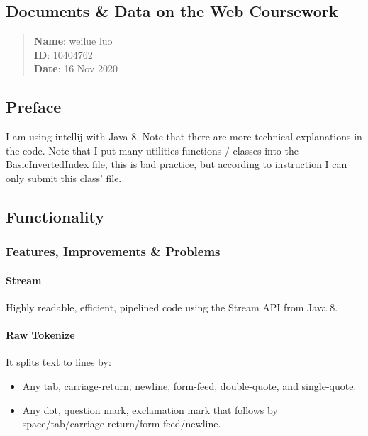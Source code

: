 \documentclass[
]{article}
\author{}
\date{}
\begin{document}
\hypertarget{header-n0}{%
\subsection{Documents \& Data on the Web Coursework}\label{header-n0}}

\begin{quote}
\textbf{Name}: weilue luo\\
\textbf{ID}: 10404762\\
\textbf{Date}: 16 Nov 2020
\end{quote}

\tableofcontents

\hypertarget{header-n7}{%
\subsection{Preface}\label{header-n7}}

I am using intellij with Java 8. Note that there are more technical
explanations in the code. Note that I put many utilities functions /
classes into the BasicInvertedIndex file, this is bad practice, but
according to instruction I can only submit this class' file.

\hypertarget{header-n9}{%
\subsection{Functionality}\label{header-n9}}

\hypertarget{header-n10}{%
\subsubsection{Features, Improvements \& Problems}\label{header-n10}}

\hypertarget{header-n426}{%
\paragraph{Stream}\label{header-n426}}

Highly readable, efficient, pipelined code using the Stream API from
Java 8.

\hypertarget{header-n15}{%
\paragraph{Raw Tokenize}\label{header-n15}}

It splits text to lines by:

\begin{itemize}
\item
  Any tab, carriage-return, newline, form-feed, double-quote, and
  single-quote.
\item
  Any dot, question mark, exclamation mark that follows by
  space/tab/carriage-return/form-feed/newline.
\end{itemize}
\end{document}
